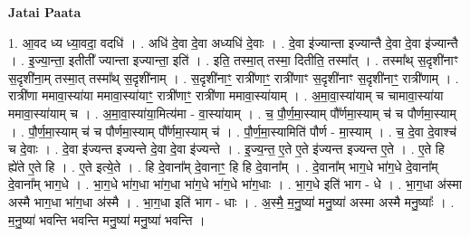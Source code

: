 \documentclass[17pt]{extarticle}
\begin{document}
\textbf{Jatai Paata} \newline

1. आ॒वद ध्य ध्या॒वदा॒ वदधि॑ । . अधि॑ दे॒वा दे॒वा अध्यधि॑ दे॒वाः । . दे॒वा इ॑ज्यान्ता इज्यान्तै दे॒वा दे॒वा इ॑ज्यान्तै । . इ॒ज्या॒न्ता॒ इतीती᳚ ज्यान्ता इज्यान्ता॒ इति॑ । . इति॒ तस्मा॒त् तस्मा॒ दितीति॒ तस्मा᳚त् । . तस्मा᳚थ् स॒दृशी॑नाꣳ स॒दृशी॑ना॒म् तस्मा॒त् तस्मा᳚थ् स॒दृशी॑नाम् । . स॒दृशी॑नाꣳ॒॒ रात्री॑णाꣳ॒॒ रात्री॑णाꣳ स॒दृशी॑नाꣳ स॒दृशी॑नाꣳ॒॒ रात्री॑णाम् । . रात्री॑णा ममावा॒स्या॑या ममावा॒स्या॑याꣳ॒॒ रात्री॑णाꣳ॒॒ रात्री॑णा ममावा॒स्या॑याम् । . अ॒मा॒वा॒स्या॑याम् च चामावा॒स्या॑या ममावा॒स्या॑याम् च । . अ॒मा॒वा॒स्या॑या॒मित्य॑मा - वा॒स्या॑याम् । . च॒ पौ॒र्ण॒मा॒स्याम् पौ᳚र्णमा॒स्याम् च॑ च पौर्णमा॒स्याम् । . पौ॒र्ण॒मा॒स्याम् च॑ च पौर्णमा॒स्याम् पौ᳚र्णमा॒स्याम् च॑ । . पौ॒र्ण॒मा॒स्यामिति॑ पौर्ण - मा॒स्याम् । . च॒ दे॒वा दे॒वाश्च॑ च दे॒वाः । . दे॒वा इ॑ज्यन्त इज्यन्ते दे॒वा दे॒वा इ॑ज्यन्ते । . इ॒ज्य॒न्त॒ ए॒ते ए॒ते इ॑ज्यन्त इज्यन्त ए॒ते । . ए॒ते हि ह्ये॑ते ए॒ते हि । . ए॒ते इत्ये॒ते । . हि दे॒वाना᳚म् दे॒वानाꣳ॒॒ हि हि दे॒वाना᳚म् । . दे॒वाना᳚म् भाग॒धे भा॑ग॒धे दे॒वाना᳚म् दे॒वाना᳚म् भाग॒धे । . भा॒ग॒धे भा॑ग॒धा भा॑ग॒धा भा॑ग॒धे भा॑ग॒धे भा॑ग॒धाः । . भा॒ग॒धे इति॑ भाग - धे । . भा॒ग॒धा अ॑स्मा अस्मै भाग॒धा भा॑ग॒धा अ॑स्मै । . भा॒ग॒धा इति॑ भाग - धाः । . अ॒स्मै॒ म॒नु॒ष्या॑ मनु॒ष्या॑ अस्मा अस्मै मनु॒ष्याः᳚ । . म॒नु॒ष्या॑ भवन्ति भवन्ति मनु॒ष्या॑ मनु॒ष्या॑ भवन्ति । \newline
\end{document}
